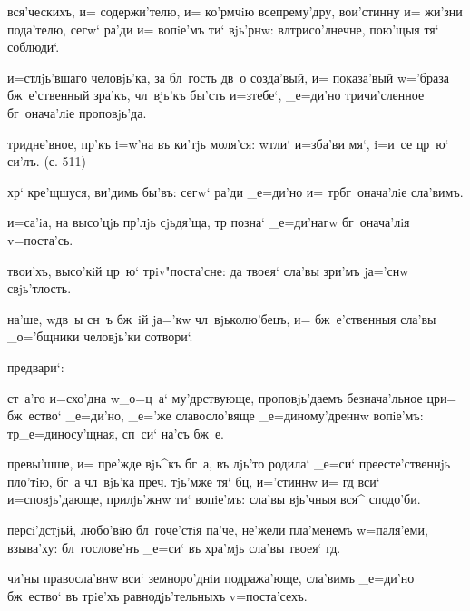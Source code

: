 вся'ческихъ, и= содержи'телю, и= ко'рмчiю всепрему'дру, 
вои'стинну и= жи'зни пода'телю, сегw` ра'ди и= вопiе'мъ 
ти` вjь'рнw: вл трисо'лнечне, пою'щыя тя` соблюди`.

и=стлjь'вшаго человjь'ка, за бл~гость дв~о созда'вый, и= 
показа'вый w='браза бж~е'ственный зра'къ, чл~вjь'къ 
бы'сть и=з\ъ тебе`, _е=ди'но тричи'сленное бг~онача'лiе 
проповjь'да.


тридне'вное, пр'къ i=w'на въ ки'тjь моля'ся: w\т тли` 
и=зба'ви мя`, i=и~се цр~ю` си'лъ. (с.  511)

хр` кре'щшуся, ви'димь бы'въ: сегw` ра'ди _е=ди'но и= 
тр бг~онача'лiе сла'вимъ.

и=са'iа, на высо'цjь пр'лjь сjьдя'ща, тр 
позна` _е=ди'нагw бг~онача'лiя v=поста'сь.

твои'хъ, высо'кiй цр~ю` трiv"поста'сне: да твоея` сла'вы 
зри'мъ jа='снw свjь'тлость.

на'ше, w\т дв~ы сн~ъ бж~iй jа='кw чл~вjьколю'бецъ, и= 
бж~е'ственныя сла'вы _о='бщники человjь'ки сотвори`.

предвари`:

ст~а'го и=схо'дна w\т _о=ц~а` му'дрствующе, 
проповjь'даемъ безнача'льное цр и= бж~ество` 
_е=ди'но, _е='же славосло'вяще _е=диному'дреннw вопiе'мъ: 
тр _е=диносу'щная, сп~си` на'съ бж~е.

превы'шше, и= пре'жде вjь^къ бг~а, въ лjь'то родила` 
_е=си` преесте'ственнjь пло'тiю, бг~а чл~вjь'ка 
преч. тjь'мже тя` бц, и='стиннw и= гд 
вси` и=сповjь'дающе, прилjь'жнw ти` вопiе'мъ: сла'вы 
вjь'чныя вся^ сподо'би.


персi'дстjьй, любо'вiю бл~гоче'стiя па'че, не'жели 
пла'менемъ w=паля'еми, взыва'ху: бл~гослове'нъ _е=си` въ 
хра'мjь сла'вы твоея` гд.

чи'ны правосла'внw вси` земноро'днiи подража'юще, 
сла'вимъ _е=ди'но бж~ество` въ трiе'хъ равнодjь'тельныхъ 
v=поста'сехъ. %


